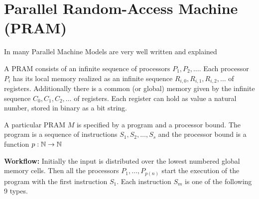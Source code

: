 \section{Parallel Random-Access Machine (PRAM)}
In \cite{karpramachandran} many Parallel Machine Models are very well written and explained
\begin{definition}[PRAM]
	A PRAM consists of an infinite sequence of processors $P_1,P_2,\dots$. Each processor $P_i$ has its local memory realized as an infinite sequence $R_{i,0},R_{i,1},R_{i,2},\dots$ of registers. Additionally there is a common (or global) memory given by the infinite sequence $C_0,C_1,C_2,\dots$ of registers. Each register can hold as value a natural number, stored in binary as a bit string.
	
	A particular PRAM $M$ is specified by a program and a processor bound. The program is a sequence of instructions $S_1,S_2,\dots, S_s$ and the processor bound is a function $p:\mathbb{N}\to \mathbb{N}$
	
	\textbf{Workflow:} Initially the input is distributed over the lowest numbered global memory cells. Then all the processors $P_1,\dots,P_{p(n)}$ start the execution of the program with the first instruction $S_1$. Each instruction $S_m$ is one of the following 9 types. 
	

\end{definition}
